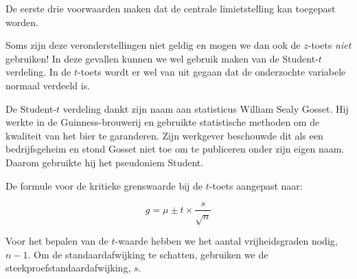 De eerste drie voorwaarden maken dat de centrale limietstelling kan toegepast worden.

Soms zijn deze veronderstellingen niet geldig en mogen we dan ook de $z$-toets \emph{niet} gebruiken! In deze gevallen kunnen we wel gebruik maken van de Student-$t$ verdeling. In de $t$-toets wordt er wel van uit gegaan dat de onderzochte variabele normaal verdeeld is.

De Student-$t$ verdeling dankt zijn naam aan statisticus William Sealy Gosset. Hij werkte in de Guinness-brouwerij en gebruikte statistische methoden om de kwaliteit van het bier te garanderen. Zijn werkgever beschouwde dit als een bedrijfsgeheim en stond Gosset niet toe om te publiceren onder zijn eigen naam. Daarom gebruikte hij het pseudoniem Student.

De formule voor de kritieke grenswaarde bij de $t$-toets aangepast naar:

\begin{equation}
g = \mu \pm t \times \frac{s}{\sqrt{n}}
\label{eq:kritieke-waarde-t-toets}
\end{equation}

Voor het bepalen van de $t$-waarde hebben we het aantal vrijheidsgraden nodig, $n-1$. Om de standaardafwijking te schatten, gebruiken we de steekproefstandaardafwijking, $s$.

